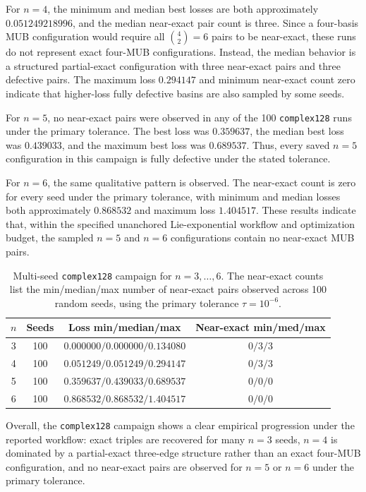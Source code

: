 \documentclass[a4paper,twocolumn,11pt,amsfonts,amssymb]{quantumarticle}
\begin{document}
For \(n=4\), the minimum and median best losses are both approximately \(0.051249218996\), and the median near-exact pair count is three. Since a four-basis MUB configuration would require all \(\binom{4}{2}=6\) pairs to be near-exact, these runs do not represent exact four-MUB configurations. Instead, the median behavior is a structured partial-exact configuration with three near-exact pairs and three defective pairs. The maximum loss \(0.294147\) and minimum near-exact count zero indicate that higher-loss fully defective basins are also sampled by some seeds.

For \(n=5\), no near-exact pairs were observed in any of the 100 \texttt{complex128} runs under the primary tolerance. The best loss was \(0.359637\), the median best loss was \(0.439033\), and the maximum best loss was \(0.689537\). Thus, every saved \(n=5\) configuration in this campaign is fully defective under the stated tolerance.

For \(n=6\), the same qualitative pattern is observed. The near-exact count is zero for every seed under the primary tolerance, with minimum and median losses both approximately \(0.868532\) and maximum loss \(1.404517\). These results indicate that, within the specified unanchored Lie-exponential workflow and optimization budget, the sampled \(n=5\) and \(n=6\) configurations contain no near-exact MUB pairs.

\begin{table}[t]
  \caption{Multi-seed \texttt{complex128} campaign for $n=3,\ldots,6$. The near-exact counts list the min/median/max number of near-exact pairs observed across 100 random seeds, using the primary tolerance $\tau = 10^{-6}$.}
  \label{tab:complex128-multiseed}
  \begin{tabular}{cccc}
    \toprule
    $n$ & Seeds & Loss min/median/max & Near-exact min/med/max \\
    \midrule
    3 & 100 & $0.000000/0.000000/0.134080$ & $0 / 3 / 3$ \\
    4 & 100 & $0.051249/0.051249/0.294147$ & $0 / 3 / 3$ \\
    5 & 100 & $0.359637/0.439033/0.689537$ & $0 / 0 / 0$ \\
    6 & 100 & $0.868532/0.868532/1.404517$ & $0 / 0 / 0$ \\
    \bottomrule
  \end{tabular}
\end{table}
Overall, the \texttt{complex128} campaign shows a clear empirical progression under the reported workflow: exact triples are recovered for many \(n=3\) seeds, \(n=4\) is dominated by a partial-exact three-edge structure rather than an exact four-MUB configuration, and no near-exact pairs are observed for \(n=5\) or \(n=6\) under the primary tolerance.
\end{document}
